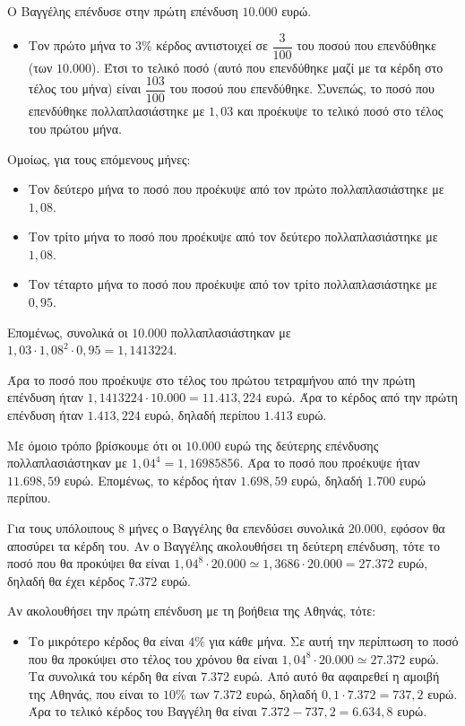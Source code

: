 
\begin{alist}
\item
\begin{rlist}
\item Ο Βαγγέλης επένδυσε στην πρώτη επένδυση $10.000$ ευρώ.
\begin{itemize}
\item Τον πρώτο μήνα το $3\%$ κέρδος αντιστοιχεί σε $\dfrac{3}{100}$ του ποσού που επενδύθηκε (των
$10.000$). Έτσι το τελικό ποσό (αυτό που επενδύθηκε μαζί με τα κέρδη στο τέλος του
μήνα) είναι $\dfrac{103}{100}$ του ποσού που επενδύθηκε. Συνεπώς, το ποσό που επενδύθηκε
πολλαπλασιάστηκε με $1,03$ και προέκυψε το τελικό ποσό στο τέλος του πρώτου
μήνα.
\end{itemize}
Ομοίως, για τους επόμενους μήνες:
\begin{itemize}
\item Τον δεύτερο μήνα το ποσό που προέκυψε από τον πρώτο πολλαπλασιάστηκε με $1,08$.
\item Τον τρίτο μήνα το ποσό που προέκυψε από τον δεύτερο πολλαπλασιάστηκε με $1,08$.
\item Τον τέταρτο μήνα το ποσό που προέκυψε από τον τρίτο πολλαπλασιάστηκε με $0,95$.
\end{itemize}
Επομένως, συνολικά οι $10.000$ πολλαπλασιάστηκαν με $1,03 \cdot 1,08^2 \cdot 0,95 = 1,1413224$.

Άρα το ποσό που προέκυψε στο τέλος του πρώτου τετραμήνου από την πρώτη
επένδυση ήταν $1,1413224 \cdot 10.000 = 11.413,224$ ευρώ.
Άρα το κέρδος από την πρώτη επένδυση ήταν $1.413,224$ ευρώ, δηλαδή περίπου $1.413$
ευρώ.

\item Με όμοιο τρόπο βρίσκουμε ότι οι $10.000$ ευρώ της δεύτερης επένδυσης
πολλαπλασιάστηκαν με $1,04^4 = 1,16985856$.
Άρα το ποσό που προέκυψε ήταν $11.698,59$ ευρώ.
Επομένως, το κέρδος ήταν $1.698,59$ ευρώ, δηλαδή $1.700$ ευρώ περίπου.
\end{rlist}

\item Για τους υπόλοιπους $8$ μήνες ο Βαγγέλης θα επενδύσει συνολικά $20.000$, εφόσον θα
αποσύρει τα κέρδη του. Αν ο Βαγγέλης ακολουθήσει τη δεύτερη επένδυση, τότε το ποσό
που θα προκύψει θα είναι $1,04^8 \cdot 20.000 \simeq 1,3686 \cdot 20.000 = 27.372$ ευρώ, δηλαδή θα
έχει κέρδος $7.372$ ευρώ.

\item Αν ακολουθήσει την πρώτη επένδυση με τη βοήθεια της Αθηνάς, τότε:
\begin{itemize}
\item Το μικρότερο κέρδος θα είναι $4\%$ για κάθε μήνα. Σε αυτή την περίπτωση το ποσό
που θα προκύψει στο τέλος του χρόνου θα είναι $1,04^8 \cdot 20.000 \simeq 27.372$ ευρώ.
Τα συνολικά του κέρδη θα είναι $7.372$ ευρώ.
Από αυτό θα αφαιρεθεί η αμοιβή της Αθηνάς, που είναι το $10\%$ των $7.372$
ευρώ, δηλαδή $0,1 \cdot 7.372 = 737,2$ ευρώ. Άρα το τελικό κέρδος του Βαγγέλη θα είναι
$7.372 - 737,2 = 6.634,8$ ευρώ.


\end{itemize}
\end{alist}
